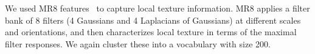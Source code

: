 
 We used MR8
  features~\cite{varma2002classifying} to capture local texture
  information.  MR8 applies a filter bank of 8 filters (4 Gaussians and 4 Laplacians of Gaussians) at different scales and orientations,
and then characterizes local texture in terms of the maximal filter responses. We again cluster these into a vocabulary with size 200.
%


